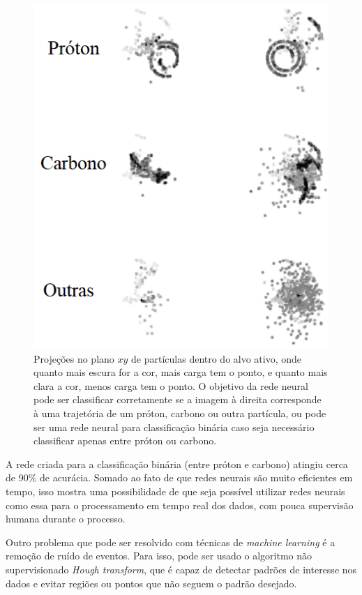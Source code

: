 \documentclass[a4paper,12pt,oneside]{book}
\begin{document}
\begin{figure}[H]
    \centering
    \includegraphics[scale = 0.5]{figs/tpc_ml.png}
    \caption{Projeções no plano $xy$ de partículas dentro do alvo ativo, onde quanto mais escura for a cor, mais carga tem o ponto, e quanto mais clara a cor, menos carga tem o ponto. O objetivo da rede neural pode ser classificar corretamente se a imagem à direita corresponde à uma trajetória de um próton, carbono ou outra partícula, ou pode ser uma rede neural para classificação binária caso seja necessário classificar apenas entre próton ou carbono\cite{KUCHERAML}.}
    \label{fig:tpc_ml}
\end{figure}

\par A rede criada para a classificação binária (entre próton e carbono) atingiu cerca de 90\% de acurácia. Somado ao fato de que redes neurais são muito eficientes em tempo, isso mostra uma possibilidade de que seja possível utilizar redes neurais como essa para o processamento em tempo real dos dados, com pouca supervisão humana durante o processo\cite{KUCHERAML}.

\par Outro problema que pode ser resolvido com técnicas de \textit{machine learning} é a remoção de ruído de eventos. Para isso, pode ser usado o algoritmo não supervisionado \textit{Hough transform}\cite{hough}, que é capaz de detectar padrões de interesse nos dados e evitar regiões ou pontos que não seguem o padrão desejado. 
\end{document}
